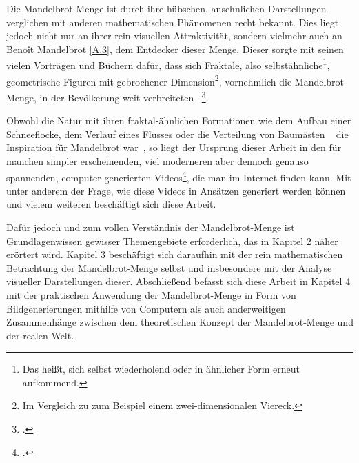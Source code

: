 
Die Mandelbrot-Menge ist durch ihre hübschen, ansehnlichen Darstellungen verglichen
mit anderen mathematischen Phänomenen recht bekannt.
Dies liegt jedoch nicht nur an ihrer rein visuellen Attraktivität,
sondern vielmehr auch an Benoît Mandelbrot \hyperref[app:3]{[A.3]},
dem Entdecker dieser Menge.
Dieser sorgte mit seinen vielen Vorträgen und Büchern dafür, dass sich Fraktale,
also selbstähnliche\footnote{
  Das heißt, sich selbst wiederholend oder in ähnlicher Form erneut aufkommend.
}, geometrische Figuren mit gebrochener Dimension\footnote{
  Im Vergleich zu zum Beispiel einem zwei-dimensionalen Viereck.
}, vornehmlich die Mandelbrot-Menge, in der Bevölkerung weit verbreiteten
~\footcite[Vgl. letzten Absatz]{ibm_fractal_2011}.

Obwohl die Natur mit ihren fraktal-ähnlichen Formationen wie dem Aufbau einer
Schneeflocke, dem Verlauf eines Flusses oder die Verteilung von Baumästen
~\cite{nnart_fractals_nodate} die Inspiration für Mandelbrot war~\cite{zink_kosmische_2014},
so liegt der Ursprung dieser Arbeit in den für
manchen simpler erscheinenden, viel moderneren aber dennoch genauso spannenden,
computer-generierten Videos\footcite[Vgl. bspw.][]{maths_town_eye_2017},
die man im Internet finden kann.
Mit unter anderem der Frage, wie diese Videos in Ansätzen generiert werden können
und vielem weiteren beschäftigt sich diese Arbeit.

Dafür jedoch und zum vollen Verständnis der Mandelbrot-Menge ist Grundlagenwissen
gewisser Themengebiete erforderlich, das in Kapitel 2 näher erörtert wird.
Kapitel 3 beschäftigt sich daraufhin mit der rein mathematischen Betrachtung der
Mandelbrot-Menge selbst und insbesondere mit der Analyse visueller Darstellungen dieser.
Abschließend befasst sich diese Arbeit in Kapitel 4 mit der praktischen Anwendung
der Mandelbrot-Menge in Form von Bildgenerierungen mithilfe von Computern als auch
anderweitigen Zusammenhänge zwischen dem theoretischen Konzept
der Mandelbrot-Menge und der realen Welt.